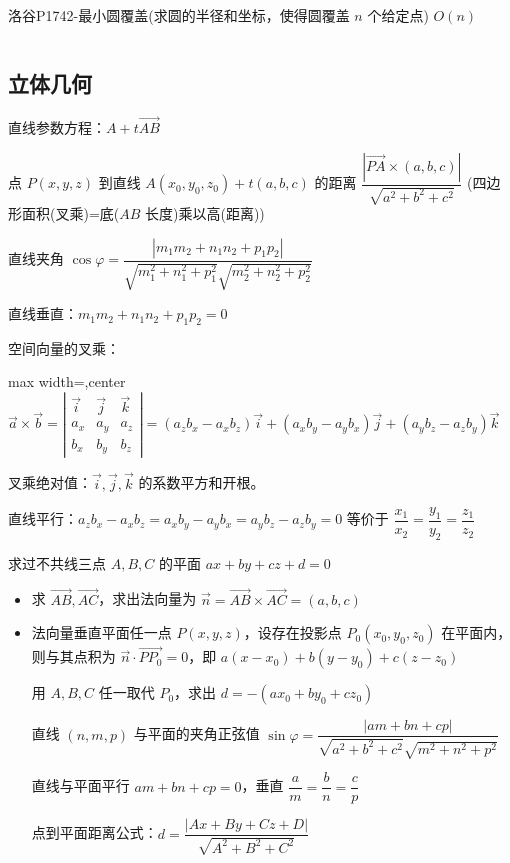 \documentclass[twocolumn,10pt]{ctexart}
\begin{document}
洛谷P1742-最小圆覆盖(求圆的半径和坐标，使得圆覆盖 $n$ 个给定点) $O(n)$

\inputminted{cpp}{code/p1742_min_circle_cover.cpp}

\subsection{立体几何}

直线参数方程：$A+t\vec{AB}$

点 $P(x,y,z)$ 到直线 $A(x_0,y_0,z_0)+t(a,b,c)$ 的距离 $\dfrac{|\vec{PA} \times (a,\allowbreak{}b,\allowbreak{}c)|}{\sqrt{a^2+b^2+c^2}}$ (四边形面积(叉乘)=底($AB$ 长度)乘以高(距离))

直线夹角 $\cos\varphi=\dfrac{|m_1m_2+n_1n_2+p_1p_2|}{\sqrt{m_1^2+n_1^2+p_1^2}\sqrt{m_2^2+n_2^2+p_2^2}}$

直线垂直：$m_1m_2+n_1n_2+p_1p_2=0$

空间向量的叉乘：

\begin{adjustbox}{max width=\linewidth,center}
$\vec a\times\vec b=\left|\begin{matrix}\vec i&\vec j&\vec k\\a_x&a_y&a_z\\b_x&b_y&b_z\end{matrix}\right|=(a_zb_x-a_xb_z)\vec i+(a_xb_y-a_yb_x)\vec j+(a_yb_z-a_zb_y)\vec k$
\end{adjustbox}

\begin{notebox}
叉乘绝对值：$\vec i,\vec j,\vec k$ 的系数平方和开根。
\end{notebox}

直线平行：$a_zb_x-a_xb_z=a_xb_y-a_yb_x=a_yb_z-a_zb_y=0$ 等价于 $\dfrac{x_1}{x_2}=\dfrac{y_1}{y_2}=\dfrac{z_1}{z_2}$

求过不共线三点 $A,B,C$ 的平面 $ax+by+cz+d=0$

\begin{itemize}
\item 求 $\vec{AB},\vec{AC}$，求出法向量为 $\vec{n} =\vec{AB}\times\vec{AC}=(a,\allowbreak{}b,\allowbreak{}c)$
\end{itemize}

\begin{itemize}
\item 法向量垂直平面任一点 $P(x,y,z)$，设存在投影点 $P_0(x_0,y_0,z_0)$ 在平面内，则与其点积为 $\vec n\cdot\vec{PP_0}=0$，即 $a(x-x_0)+b(y-y_0)+c(z-z_0)$

用 $A,B,C$ 任一取代 $P_0$，求出 $d=-(ax_0+by_0+cz_0)$

直线 $(n,m,p)$ 与平面的夹角正弦值 $\sin\varphi=\dfrac{|am+bn+cp|}{\sqrt{a^2+b^2+c^2}\sqrt{m^2+n^2+p^2}}$

直线与平面平行 $am+bn+cp=0$，垂直 $\dfrac am=\dfrac bn=\dfrac cp$

点到平面距离公式：$d=\dfrac{|Ax+By+Cz+D|}{\sqrt{A^2+B^2+C^2}}$
\end{itemize}
\end{document}
